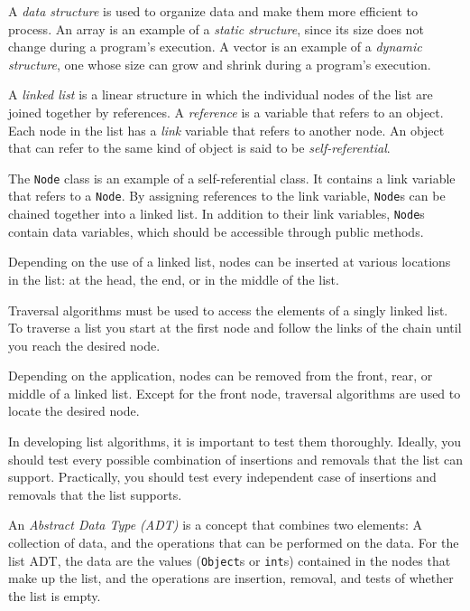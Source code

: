 
\begin{SMBL}
\item  A {\it data structure} is used to organize
data and make them more efficient to process.  An array is
an example of a {\it static structure}, since its size
does not change during a program's execution.  A vector
is an example of a {\it dynamic structure}, one whose
size can grow and shrink during a program's execution.

\item  A {\it linked list} is a linear structure in which
the individual nodes of the list are joined together by references.  A
{\it reference} is a variable that refers to an object.  Each node in
the list has a {\it link} variable that refers to another node.  An
object that can refer to the same kind of object is said to be {\it
self-referential}.

\item  The {\tt Node} class is an example of a self-referential class.
It contains a link variable that refers to a {\tt Node}. By assigning
references to the link variable, {\tt Node}s can be chained together
into a linked list.  In addition to their link variables, {\tt Node}s
contain data variables, which should be accessible through public
methods.

\item  Depending on the use of a linked list, nodes can be
inserted at various locations in the list: at the head,
the end, or in the middle of the list.

\item  Traversal algorithms must be used to access the elements
of a singly linked list.  To traverse a list you start at the
first node and follow the links of the chain until you
reach the desired node.

\item  Depending on the application, nodes can be
removed from the front, rear, or middle of a linked list.
Except for the front node, traversal algorithms are used to locate the
desired node.

\item  In developing list algorithms, it is important to test
them thoroughly.  Ideally, you should test every possible combination
of insertions and removals that the list can support.  Practically, you
should test every independent case of insertions and removals that the
list supports.

\item  An {\it Abstract Data Type (ADT)} is a concept
that combines two elements: A collection of data, and the operations
that can be performed on the data.  For the list ADT, the data are the
values ({\tt Object}s or {\tt int}s) contained in the nodes that make
up the list, and the operations are insertion, removal, and tests of
whether the list is empty.


\end{SMBL}
